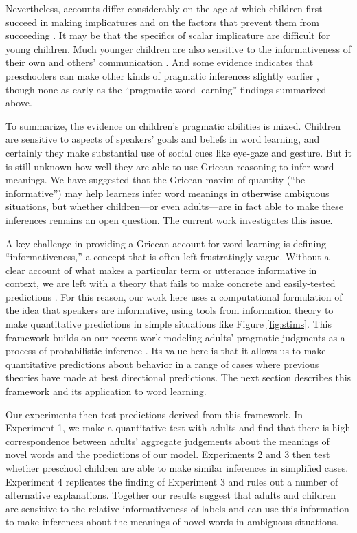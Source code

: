 \documentclass[man,noapacite]{apa2}
\begin{document}
Nevertheless, accounts differ considerably on the age at which children first succeed in making implicatures \cite{papafragou2003,guasti2005} and on the factors that prevent them from succeeding \cite{barner2010,barner2011,katsos2011}. It may be that the specifics of scalar implicature are difficult for young children. Much younger children are also sensitive to the informativeness of their own and others' communication \cite{oneill2001,liszkowski2008,matthews2007,matthews2012}. And some evidence indicates that preschoolers can make other kinds of pragmatic inferences slightly earlier \cite{kurumada2013,stiller2014}, though none as early as the ``pragmatic word learning'' findings summarized above. 

To summarize, the evidence on children's pragmatic abilities is mixed. Children are sensitive to aspects of speakers' goals and beliefs in word learning, and certainly they make substantial use of social cues like eye-gaze and gesture. But it is still unknown how well they are able to use Gricean reasoning to infer word meanings. We have suggested that the Gricean maxim of quantity (``be informative'') may help learners infer word meanings in otherwise ambiguous situations, but whether children---or even adults---are in fact able to make these inferences remains an open question. The current work investigates this issue. 

A key challenge in providing a Gricean account for word learning is defining ``informativeness,'' a concept that is often left frustratingly vague. Without a clear account of what makes a particular term or utterance informative in context, we are left with a theory that fails to make concrete and easily-tested predictions \cite{pea1979}. For this reason, our work here uses a computational formulation of the idea that speakers are informative, using tools from information theory to make quantitative predictions in simple situations like Figure \ref{fig:stims}. This framework builds on our recent work modeling adults' pragmatic judgments as a process of probabilistic inference \cite{frank2012}. Its value here is that it allows us to make quantitative predictions about behavior in a range of cases where previous theories have made at best directional predictions. The next section describes this framework and its application to word learning.

Our experiments then test predictions derived from this framework. In Experiment 1, we make a quantitative test with adults and find that there is high correspondence between adults' aggregate judgements about the meanings of novel words and the predictions of our model. Experiments 2 and 3 then test whether preschool children are able to make similar inferences in simplified cases. Experiment 4 replicates the finding of Experiment 3 and rules out a number of alternative explanations. Together our results suggest that adults and children are sensitive to the relative informativeness of labels and can use this information to make inferences about the meanings of novel words in ambiguous situations.  
\end{document}
